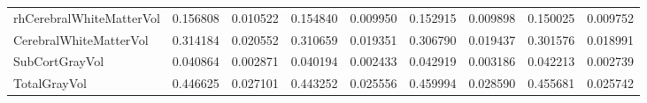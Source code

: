 \begin{table}[H]
\begin{tabular}{l|cc|cc|cc|cc}
rhCerebralWhiteMatterVol & 0.156808 & 0.010522 & 0.154840 & 0.009950 & 0.152915 & 0.009898 & 0.150025 & 0.009752 \\
CerebralWhiteMatterVol & 0.314184 & 0.020552 & 0.310659 & 0.019351 & 0.306790 & 0.019437 & 0.301576 & 0.018991 \\
SubCortGrayVol & 0.040864 & 0.002871 & 0.040194 & 0.002433 & 0.042919 & 0.003186 & 0.042213 & 0.002739 \\
TotalGrayVol & 0.446625 & 0.027101 & 0.443252 & 0.025556 & 0.459994 & 0.028590 & 0.455681 & 0.025742 \\
\hline
\end{tabular}
\label{tab:version_comparison}
\end{table}